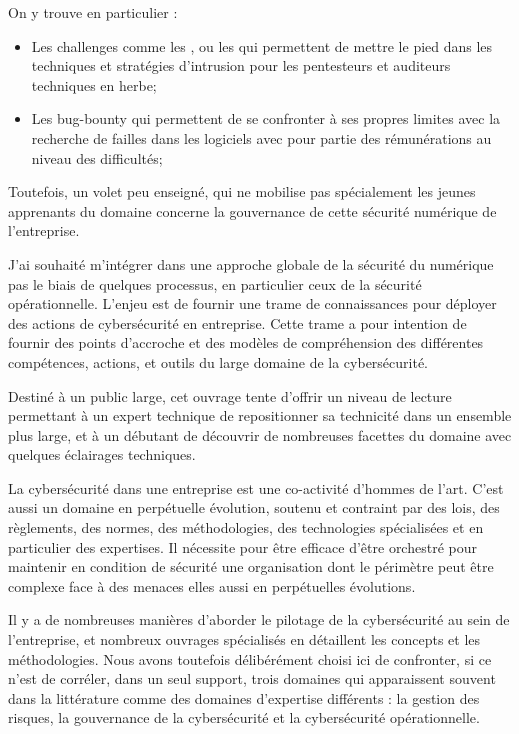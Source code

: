 On y trouve en particulier :

\begin{itemize}
  \item Les challenges comme les , ou les  qui permettent de mettre le pied dans les techniques et stratégies d'intrusion pour les pentesteurs et auditeurs techniques en herbe;
  \item Les bug-bounty qui permettent de se confronter à ses propres limites avec la recherche de failles dans les logiciels avec pour partie des rémunérations au niveau des difficultés;
\end{itemize}

Toutefois, un volet peu enseigné, qui ne mobilise pas spécialement les jeunes apprenants du domaine concerne la gouvernance de cette sécurité numérique de l'entreprise.

J'ai souhaité m'intégrer dans  une approche globale de la sécurité du numérique pas le biais de quelques processus, en particulier ceux de la sécurité opérationnelle. L'enjeu est de fournir une trame de connaissances pour déployer des actions de cybersécurité en entreprise.
Cette trame a pour intention de fournir des points d'accroche et des modèles de compréhension des différentes compétences, actions, et outils du large domaine de la cybersécurité.

Destiné à un public large, cet ouvrage tente d'offrir un niveau de lecture permettant à un expert technique de repositionner sa technicité dans un ensemble plus large, et  à un débutant de découvrir de nombreuses facettes du domaine avec quelques éclairages techniques.

La cybersécurité dans une entreprise est une co-activité d'hommes de l'art.  C'est aussi un domaine en perpétuelle évolution, soutenu et contraint par des lois, des règlements, des normes, des méthodologies,  des technologies spécialisées et en particulier des expertises.  Il nécessite pour être efficace d'être orchestré pour maintenir en condition de sécurité une organisation dont le périmètre peut être complexe face à des menaces elles aussi en perpétuelles évolutions.

Il y a de nombreuses manières d’aborder le pilotage de la cybersécurité au sein de l’entreprise, et nombreux ouvrages spécialisés en détaillent les concepts et les méthodologies. Nous avons toutefois délibérément choisi ici de confronter, si ce n'est de corréler, dans un seul support, trois domaines qui apparaissent souvent dans la littérature comme des domaines d'expertise différents : la gestion des risques, la gouvernance de la cybersécurité et la cybersécurité opérationnelle. 

